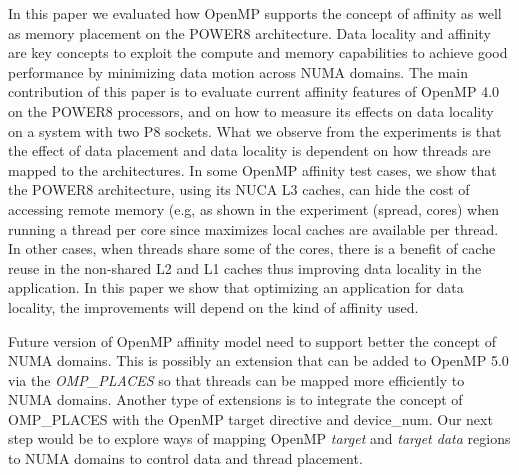 In this paper we evaluated how OpenMP supports the concept of affinity as well as memory placement on the POWER8 architecture. 
Data locality and affinity are key concepts to exploit the compute and memory capabilities to achieve good performance by minimizing data motion across NUMA domains. 
The main contribution of this paper is to evaluate current affinity features of OpenMP 4.0 on the POWER8 processors, and on how to measure its effects on data locality on a system with two P8 sockets. 
What we observe from the experiments is that the effect of data placement and data locality is dependent on how threads are mapped to the architectures. In some OpenMP affinity test cases, we show that the POWER8 architecture, using its NUCA L3 caches, can hide the cost of accessing remote memory (e.g, as shown in the experiment (spread, cores) when running a thread per core since maximizes local caches are available per thread. 
In other cases, when threads share some of the cores, there is a benefit of cache reuse in the non-shared L2 and L1 caches thus improving data locality in the application.
 In this paper we show that optimizing an application for data locality, the improvements will depend on the kind of affinity used. 

Future version of OpenMP affinity model need to support better the concept of NUMA domains. 
This is possibly an extension that can be added to OpenMP 5.0 via the \emph{OMP\_PLACES} so that threads can be mapped more efficiently to NUMA domains. Another type of extensions is to integrate the concept of OMP\_PLACES with the OpenMP target directive and device\_num. Our next step would be to explore ways of mapping OpenMP \emph{target} and \emph{target data} 
regions to NUMA domains to control data and thread placement.
